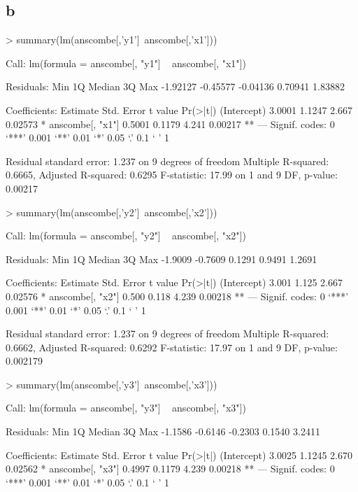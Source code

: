 \subsection{b}
\begin{Schunk}
\begin{Sinput}
> summary(lm(anscombe[,'y1']~anscombe[,'x1']))
\end{Sinput}
\begin{Soutput}
Call:
lm(formula = anscombe[, "y1"] ~ anscombe[, "x1"])

Residuals:
     Min       1Q   Median       3Q      Max 
-1.92127 -0.45577 -0.04136  0.70941  1.83882 

Coefficients:
                 Estimate Std. Error t value Pr(>|t|)   
(Intercept)        3.0001     1.1247   2.667  0.02573 * 
anscombe[, "x1"]   0.5001     0.1179   4.241  0.00217 **
---
Signif. codes:  0 ‘***’ 0.001 ‘**’ 0.01 ‘*’ 0.05 ‘.’ 0.1 ‘ ’ 1 

Residual standard error: 1.237 on 9 degrees of freedom
Multiple R-squared: 0.6665,	Adjusted R-squared: 0.6295 
F-statistic: 17.99 on 1 and 9 DF,  p-value: 0.00217 
\end{Soutput}
\begin{Sinput}
> summary(lm(anscombe[,'y2']~anscombe[,'x2']))
\end{Sinput}
\begin{Soutput}
Call:
lm(formula = anscombe[, "y2"] ~ anscombe[, "x2"])

Residuals:
    Min      1Q  Median      3Q     Max 
-1.9009 -0.7609  0.1291  0.9491  1.2691 

Coefficients:
                 Estimate Std. Error t value Pr(>|t|)   
(Intercept)         3.001      1.125   2.667  0.02576 * 
anscombe[, "x2"]    0.500      0.118   4.239  0.00218 **
---
Signif. codes:  0 ‘***’ 0.001 ‘**’ 0.01 ‘*’ 0.05 ‘.’ 0.1 ‘ ’ 1 

Residual standard error: 1.237 on 9 degrees of freedom
Multiple R-squared: 0.6662,	Adjusted R-squared: 0.6292 
F-statistic: 17.97 on 1 and 9 DF,  p-value: 0.002179 
\end{Soutput}
\begin{Sinput}
> summary(lm(anscombe[,'y3']~anscombe[,'x3']))
\end{Sinput}
\begin{Soutput}
Call:
lm(formula = anscombe[, "y3"] ~ anscombe[, "x3"])

Residuals:
    Min      1Q  Median      3Q     Max 
-1.1586 -0.6146 -0.2303  0.1540  3.2411 

Coefficients:
                 Estimate Std. Error t value Pr(>|t|)   
(Intercept)        3.0025     1.1245   2.670  0.02562 * 
anscombe[, "x3"]   0.4997     0.1179   4.239  0.00218 **
---
Signif. codes:  0 ‘***’ 0.001 ‘**’ 0.01 ‘*’ 0.05 ‘.’ 0.1 ‘ ’ 1 


\end{Soutput}
\end{Schunk}

